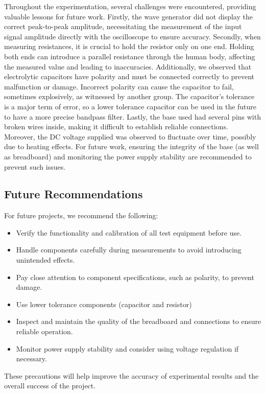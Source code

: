 \documentclass[lettersize,journal]{IEEEtran}
\begin{document}
Throughout the experimentation, several challenges were encountered, providing valuable lessons for future work. Firstly, the wave generator did not display the correct peak-to-peak amplitude, necessitating the measurement of the input signal amplitude directly with the oscilloscope to ensure accuracy. Secondly, when measuring resistances, it is crucial to hold the resistor only on one end. Holding both ends can introduce a parallel resistance through the human body, affecting the measured value and leading to inaccuracies. Additionally, we observed that electrolytic capacitors have polarity and must be connected correctly to prevent malfunction or damage. Incorrect polarity can cause the capacitor to fail, sometimes explosively, as witnessed by another group. The capacitor's tolerance is a major term of error, so a lower tolerance capacitor can be used in the future to have a more precise bandpass filter. Lastly, the base used had several pins with broken wires inside, making it difficult to establish reliable connections. Moreover, the DC voltage supplied was observed to fluctuate over time, possibly due to heating effects. For future work, ensuring the integrity of the base (as well as breadboard) and monitoring the power supply stability are recommended to prevent such issues.

\subsection{Future Recommendations}

For future projects, we recommend the following:

\begin{itemize} \item Verify the functionality and calibration of all test equipment before use. \item Handle components carefully during measurements to avoid introducing unintended effects. \item Pay close attention to component specifications, such as polarity, to prevent damage. \item Use lower tolerance components (capacitor and resistor) \item Inspect and maintain the quality of the breadboard and connections to ensure reliable operation. \item Monitor power supply stability and consider using voltage regulation if necessary. \end{itemize}

These precautions will help improve the accuracy of experimental results and the overall success of the project.
\end{document}
